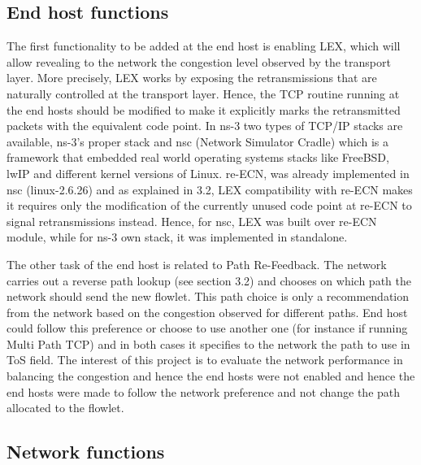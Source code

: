 \subsection{End host functions}

The first functionality to be added at the end host is enabling LEX, which will allow revealing to the network the congestion level observed by the transport layer. More precisely, LEX works by exposing the retransmissions that are naturally controlled at the transport layer.  Hence, the TCP routine running at the end hosts should be modified to make it explicitly marks the retransmitted packets with the equivalent code point. In ns-3 two types of TCP/IP stacks are available, ns-3's proper stack and nsc (Network Simulator Cradle) which is a framework that embedded real world operating systems stacks like FreeBSD, lwIP and different kernel versions of Linux. re-ECN, was already implemented in nsc (linux-2.6.26) and as explained in 3.2, LEX compatibility with re-ECN makes it requires only the modification of the currently unused code point at re-ECN to signal retransmissions instead. Hence, for nsc, LEX was built over re-ECN module, while for ns-3 own stack, it was implemented in standalone.

The other task of the end host is related to Path Re-Feedback. The network carries out a reverse path lookup (see section 3.2) and chooses on which path the network should send the new flowlet. This path choice is only a recommendation from the network based on the congestion observed  for different paths. End host could follow this preference or choose to use another one (for instance if running Multi Path TCP) and in both cases it specifies to the network the path to use in ToS field. The interest of this project is to evaluate the network performance in balancing the congestion and hence the end hosts were not enabled and hence the end hosts were made to follow the network preference and not change the path allocated to the flowlet. 

\subsection{Network functions}

